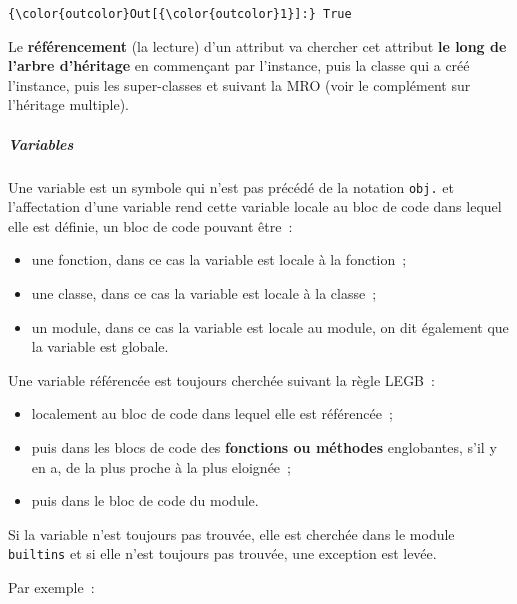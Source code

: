\begin{Verbatim}[commandchars=\\\{\},frame=single,framerule=0.3mm,rulecolor=\color{cellframecolor}]
{\color{outcolor}Out[{\color{outcolor}1}]:} True
\end{Verbatim}
            
    Le \textbf{référencement} (la lecture) d'un attribut va chercher cet
attribut \textbf{le long de l'arbre d'héritage} en commençant par
l'instance, puis la classe qui a créé l'instance, puis les super-classes
et suivant la MRO (voir le complément sur l'héritage multiple).

    \hypertarget{variables}{%
\subparagraph{Variables}\label{variables}}

    Une variable est un symbole qui n'est pas précédé de la notation
\texttt{obj.} et l'affectation d'une variable rend cette variable locale
au bloc de code dans lequel elle est définie, un bloc de code pouvant
être~:

\begin{itemize}
\tightlist
\item
  une fonction, dans ce cas la variable est locale à la fonction~;
\item
  une classe, dans ce cas la variable est locale à la classe~;
\item
  un module, dans ce cas la variable est locale au module, on dit
  également que la variable est globale.
\end{itemize}

Une variable référencée est toujours cherchée suivant la règle LEGB~:

\begin{itemize}
\tightlist
\item
  localement au bloc de code dans lequel elle est référencée~;
\item
  puis dans les blocs de code des \textbf{fonctions ou méthodes}
  englobantes, s'il y en a, de la plus proche à la plus eloignée~;
\item
  puis dans le bloc de code du module.
\end{itemize}

Si la variable n'est toujours pas trouvée, elle est cherchée dans le
module \texttt{builtins} et si elle n'est toujours pas trouvée, une
exception est levée.

Par exemple~:

